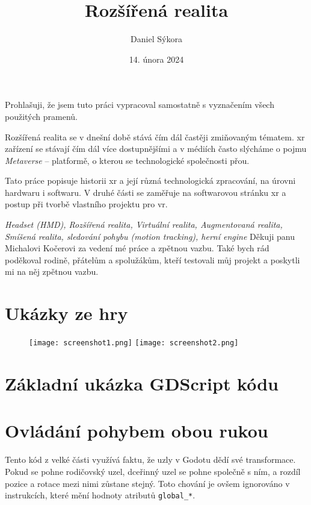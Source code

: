 \documentclass[12pt]{report}
\author{Daniel Sýkora}
\title{Rozšířená realita}
\date{14. února 2024}
\begin{document}
\mytitlepage
\prohlaseni
{
	Prohlašuji, že jsem tuto práci vypracoval samostatně s vyznačením všech použitých pramenů.
}
\abstrakt
{ %
	Rozšířená realita se v dnešní době stává čím dál častěji zmiňovaným tématem. \gls{xr} zařízení se stávají čím dál více dostupnějšími a v médiích často slýcháme o pojmu \textit{Metaverse} -- platformě, o kterou se technologické společnosti přou.

	Tato práce popisuje historii \gls{xr} a její různá technologická zpracování, na úrovni hardwaru i softwaru. V druhé části se zaměřuje na softwarovou stránku \gls{xr} a postup při tvorbě vlastního projektu pro \gls{vr}.
}
{ %
	\textit{Headset (HMD), Rozšířená realita, Virtuální realita, Augmentovaná realita, Smíšená realita, sledování pohybu (motion tracking), herní engine}
}
\podekovani
{
	Děkuji panu Michalovi Kočerovi za vedení mé práce a zpětnou vazbu. Také bych rád poděkoval rodině, přátelům a spolužákům, kteří testovali můj projekt a poskytli mi na něj zpětnou vazbu.
}

\tableofcontents
\newpage






\nocite{*}

\printbibliography

\printglossary[title={Zkratky}]

\listoffigures
{}

\appendix

\chapter{Ukázky ze hry}
\begin{figure}[H]
	\centering
	\texttt{[image: screenshot1.png]}
	\texttt{[image: screenshot2.png]}
\end{figure}

\chapter{Základní ukázka GDScript kódu}\label{apx_gscript_sample}


\chapter{Ovládání pohybem obou rukou}\label{apx_gripped_object_transformation}
Tento kód z velké části využívá faktu, že uzly v Godotu dědí své transformace. Pokud se pohne rodičovský uzel, dceřinný uzel se pohne společně s ním, a rozdíl pozice a rotace mezi nimi zůstane stejný. Toto chování je ovšem ignorováno v instrukcích, které mění hodnoty atributů \texttt{global\_*}.
\end{document}

